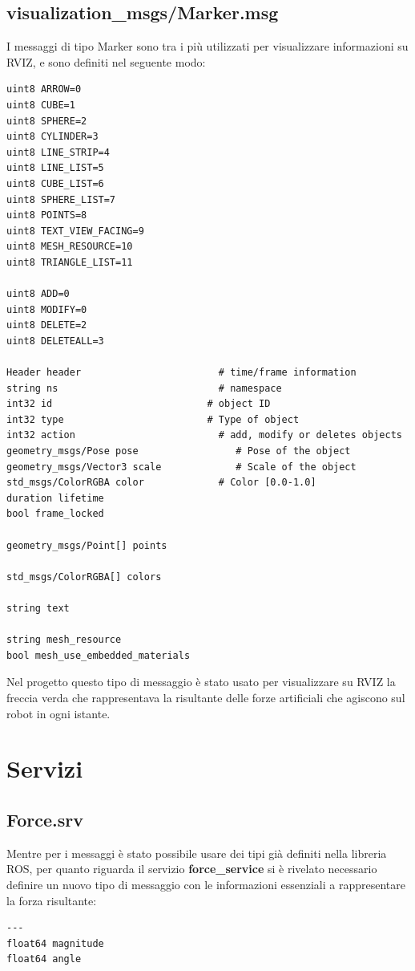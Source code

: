 \documentclass[Lau, binding=0.6cm, oneside]{sapthesis}
\begin{document}
\subsection{visualization\_msgs/Marker.msg}
I messaggi di tipo Marker sono tra i più utilizzati per visualizzare informazioni su RVIZ, e sono definiti nel seguente modo\cite{fonte7}:
\begin{lstlisting}
uint8 ARROW=0
uint8 CUBE=1
uint8 SPHERE=2
uint8 CYLINDER=3
uint8 LINE_STRIP=4
uint8 LINE_LIST=5
uint8 CUBE_LIST=6
uint8 SPHERE_LIST=7
uint8 POINTS=8
uint8 TEXT_VIEW_FACING=9
uint8 MESH_RESOURCE=10
uint8 TRIANGLE_LIST=11

uint8 ADD=0
uint8 MODIFY=0
uint8 DELETE=2
uint8 DELETEALL=3

Header header                        # time/frame information
string ns                            # namespace
int32 id                           # object ID
int32 type                         # Type of object
int32 action                         # add, modify or deletes objects
geometry_msgs/Pose pose                 # Pose of the object
geometry_msgs/Vector3 scale             # Scale of the object
std_msgs/ColorRGBA color             # Color [0.0-1.0]
duration lifetime
bool frame_locked

geometry_msgs/Point[] points

std_msgs/ColorRGBA[] colors

string text

string mesh_resource
bool mesh_use_embedded_materials
\end{lstlisting}	

Nel progetto questo tipo di messaggio è stato usato per visualizzare su RVIZ la freccia verda che rappresentava la risultante delle forze artificiali che agiscono sul robot in ogni istante.

\section{Servizi}
\subsection{Force.srv}
Mentre per i messaggi è stato possibile usare dei tipi già definiti nella libreria ROS, per quanto riguarda il servizio \textbf{force\_service} si è rivelato necessario definire un nuovo tipo di messaggio con le informazioni essenziali a rappresentare la forza risultante:

\begin{lstlisting}
---
float64 magnitude
float64 angle
\end{lstlisting}
\end{document}
